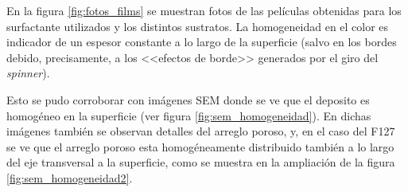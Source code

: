 		En la figura \ref{fig:fotos_films} se muestran fotos de las películas obtenidas para los surfactante utilizados y los distintos sustratos. La homogeneidad en el color es indicador de un espesor constante a lo largo de la superficie (salvo en los bordes debido, precisamente, a los <<efectos de borde>> generados por el giro del \textit{spinner})\cite{Franssila2004,Jaeger2001}. 

		Esto se pudo corroborar con imágenes SEM donde se ve que el deposito es homogéneo en la superficie  (ver figura \ref{fig:sem_homogeneidad}). En dichas imágenes también se observan detalles del arreglo poroso, y, en el caso del F127 se ve que el arreglo poroso esta homogéneamente distribuido también a lo largo del eje transversal a la superficie, como se muestra en la ampliación de la figura \ref{fig:sem_homogeneidad2}.
